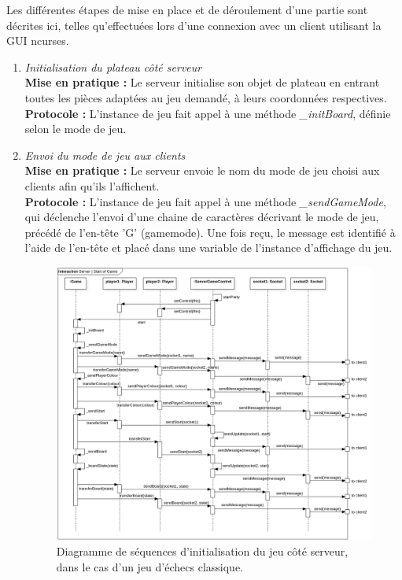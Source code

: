\documentclass[10pt, a4paper]{article}
\begin{document}
Les différentes étapes de mise en place et de déroulement d'une partie sont décrites ici, telles qu'effectuées lors d'une connexion avec un client utilisant la GUI ncurses.

\begin{enumerate}

\item \textit{Initialisation du plateau côté serveur}\\
\textbf{Mise en pratique :} Le serveur initialise son objet de plateau en entrant toutes les pièces adaptées au jeu demandé, à leurs coordonnées respectives.\\
\textbf{Protocole :} L'instance de jeu fait appel à une méthode \textit{\_initBoard}, définie selon le mode de jeu.

\item \textit{Envoi du mode de jeu aux clients}\\
\textbf{Mise en pratique :} Le serveur envoie le nom du mode de jeu choisi aux clients afin qu'ils l'affichent.\\
\textbf{Protocole :} L'instance de jeu fait appel à une méthode \textit{\_sendGameMode}, qui déclenche l'envoi d'une chaine de caractères décrivant le mode de jeu, précédé de l'en-tête 'G' (gamemode). Une fois reçu, le message est identifié à l'aide de l'en-tête et placé dans une variable de l'instance d'affichage du jeu.

\begin{figure} [ht]
\centering
\includegraphics[scale=0.40]{Sequence_Server_GameStart.png}
\caption{Diagramme de séquences d'initialisation du jeu côté serveur, dans le cas d'un jeu d'échecs classique.}
\end{figure}


\end{enumerate}
\end{document}
